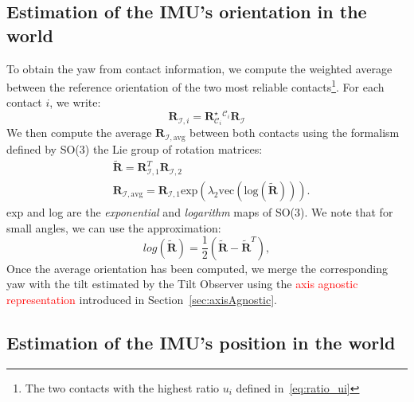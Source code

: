 \documentclass{IJCAS}
\begin{document}
\subsection{Estimation of the IMU's orientation in the world}

To obtain the yaw from contact information, we compute the weighted average between the reference orientation of the two most reliable contacts\footnote{The two contacts with the highest ratio $u_{i}$ defined in~\eqref{eq:ratio_ui}}. For each contact $i$, we write:
\begin{equation}
    \boldsymbol{R}_{\mathcal{I}, i} = \boldsymbol{R}^{\star}_{\mathcal{C}_{i}} {}^{\mathcal{C}_{i}} \boldsymbol{R}_{\mathcal{I}} 
\end{equation}
We then compute the average $\boldsymbol{R}_{\mathcal{I}, \text{avg}}$ between both contacts using the formalism defined by SO(3) the Lie group of rotation matrices:
\begin{align}
    &\tilde{\boldsymbol{R}} = \boldsymbol{R}^{T}_{\mathcal{I}, 1} \boldsymbol{R}_{\mathcal{I}, 2}  \\
 & \boldsymbol{R}_{\mathcal{I}, \text{avg}} = \boldsymbol{R}_{\mathcal{I}, 1} \text{exp} \left( \lambda_{2} \text{vec}\left(\text{log} \left( \tilde{\boldsymbol{R}}\right)\right)  \right).
\end{align}
exp and log are the \emph{exponential} and \emph{logarithm} maps of SO(3). We note that for small angles, we can use the approximation:
\begin{equation}
log\left(\tilde{\boldsymbol{R}}\right) = \frac{1}{2} \left(\tilde{\boldsymbol{R}}-\tilde{\boldsymbol{R}}^{T}\right), \label{eq:log_small}
\end{equation}
Once the average orientation has been computed, we merge the corresponding yaw with the tilt estimated by the Tilt Observer using the \textcolor{red}{axis agnostic representation} introduced in Section~\ref{sec:axisAgnostic}.

\subsection{Estimation of the IMU's position in the world}
\end{document}
